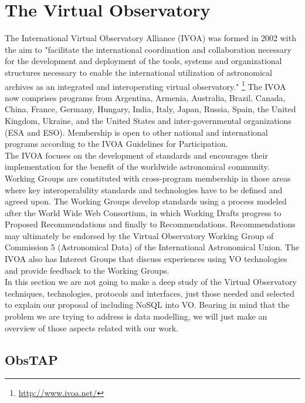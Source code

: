 \chapter{The Virtual Observatory}

The International Virtual Observatory Alliance (IVOA) was formed in 2002 with the aim to "facilitate the international coordination and collaboration necessary for the development and deployment of the tools, systems and organizational structures necessary to enable the international utilization of astronomical archives as an integrated and interoperating virtual observatory." \footnote{\url{http://www.ivoa.net/}} The IVOA now comprises programs from Argentina, Armenia, Australia, Brazil, Canada, China,  France, Germany, Hungary, India, Italy, Japan, Russia, Spain, the United Kingdom, Ukraine, and the United States and inter-governmental organizations (ESA and ESO). Membership is open to other national and international programs according to the IVOA Guidelines for Participation.\\

The IVOA focuses on the development of standards and encourages their implementation for the benefit of the worldwide astronomical community. Working Groups are constituted with cross-program membership in those areas where key interoperability standards and technologies have to be defined and agreed upon. The Working Groups develop standards using a process modeled after the World Wide Web Consortium, in which Working Drafts progress to Proposed Recommendations and finally to Recommendations. Recommendations may ultimately be endorsed by the Virtual Observatory Working Group of Commission 5 (Astronomical Data) of the International Astronomical Union. The IVOA also has Interest Groups that discuss experiences using VO technologies and provide feedback to the Working Groups.\\

In this section we are not going to make a deep study of the Virtual Observatory techniques, technologies, protocols and interfaces, just those needed and selected to explain our proposal of including NoSQL into VO. Bearing in mind that the problem we are trying to address is data modelling, we will just make an overview of those aspects related with our work.\\

\section{ObsTAP}

